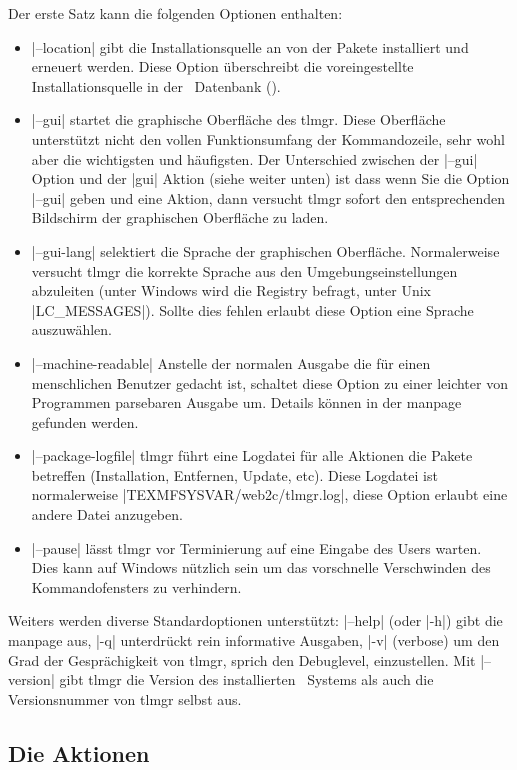 Der erste Satz kann die folgenden Optionen enthalten:
\begin{itemize}
\item |--location|  gibt die Installationsquelle an von der
  Pakete installiert und erneuert werden. Diese Option überschreibt die
  voreingestellte Installationsquelle in der \tl\ Datenbank ().
\item |--gui| startet die graphische Oberfläche des tlmgr. Diese
  Oberfläche unterstützt nicht den vollen Funktionsumfang der Kommandozeile,
  sehr wohl aber die wichtigsten und häufigsten.
  Der Unterschied zwischen der |--gui| Option und der |gui| Aktion (siehe
  weiter unten) ist dass wenn Sie die Option |--gui| geben und eine Aktion,
  dann versucht tlmgr sofort den entsprechenden Bildschirm der graphischen
  Oberfläche zu laden.
\item |--gui-lang|  selektiert die Sprache der graphischen
  Oberfläche. Normalerweise versucht tlmgr die korrekte Sprache aus
  den Umgebungseinstellungen abzuleiten (unter Windows wird die
  Registry befragt, unter Unix |LC_MESSAGES|). Sollte dies fehlen
  erlaubt diese Option eine Sprache auszuwählen.
\item |--machine-readable| Anstelle der normalen Ausgabe die für einen
  menschlichen Benutzer gedacht ist, schaltet diese Option zu einer
  leichter von Programmen parsebaren Ausgabe um. Details können in der
  manpage \citep{tlmgr-manpage} gefunden werden.
\item |--package-logfile|  tlmgr führt eine Logdatei für alle
  Aktionen die Pakete betreffen (Installation, Entfernen, Update, etc).
  Diese Logdatei ist normalerweise |TEXMFSYSVAR/web2c/tlmgr.log|, diese
  Option erlaubt eine andere Datei anzugeben.
\item |--pause| lässt tlmgr vor Terminierung auf eine Eingabe des Users
  warten. Dies kann auf Windows nützlich sein um das vorschnelle
  Verschwinden des Kommandofensters zu verhindern.
\end{itemize}

Weiters werden diverse Standardoptionen unterstützt: |--help| (oder
|-h|) gibt die manpage aus, |-q| unterdrückt rein informative
Ausgaben, |-v| (verbose) um den Grad der Gesprächigkeit von tlmgr, sprich
den Debuglevel, einzustellen. Mit |--version| gibt tlmgr die Version
des installierten \tl\ Systems als auch die Versionsnummer von tlmgr selbst
aus.

\subsection{Die Aktionen}


